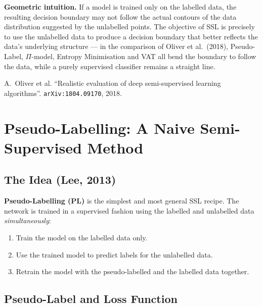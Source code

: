 \documentclass[11pt,a4paper]{article}
\theoremstyle{definition}
\theoremstyle{plain}
\theoremstyle{remark}
\begin{document}
\textbf{Geometric intuition.} If a model is trained only on the labelled data, the resulting decision boundary may not follow the actual contours of the data distribution suggested by the unlabelled points. The objective of SSL is precisely to use the unlabelled data to produce a decision boundary that better reflects the data's underlying structure --- in the comparison of Oliver et al.\ (2018), Pseudo-Label, $\Pi$-model, Entropy Minimisation and VAT all bend the boundary to follow the data, while a purely supervised classifier remains a straight line.

\begin{tcolorbox}[colback=blue!5!white,colframe=blue!60!black,title={Reference}]
A.\ Oliver et al. ``Realistic evaluation of deep semi-supervised learning algorithms''. \texttt{arXiv:1804.09170}, 2018.
\end{tcolorbox}


\section{Pseudo-Labelling: A Naive Semi-Supervised Method}

\subsection{The Idea (Lee, 2013)}

\textbf{Pseudo-Labelling (PL)} is the simplest and most general SSL recipe. The network is trained in a supervised fashion using the labelled and unlabelled data \emph{simultaneously}:

\begin{tcolorbox}[colback=gray!5!white,colframe=gray!60!black,title=\textbf{Pseudo-Labelling --- Three Steps}]
\begin{enumerate}
    \item Train the model on the labelled data only.
    \item Use the trained model to predict labels for the unlabelled data.
    \item Retrain the model with the pseudo-labelled and the labelled data together.
\end{enumerate}
\end{tcolorbox}

\subsection{Pseudo-Label and Loss Function}
\end{document}

